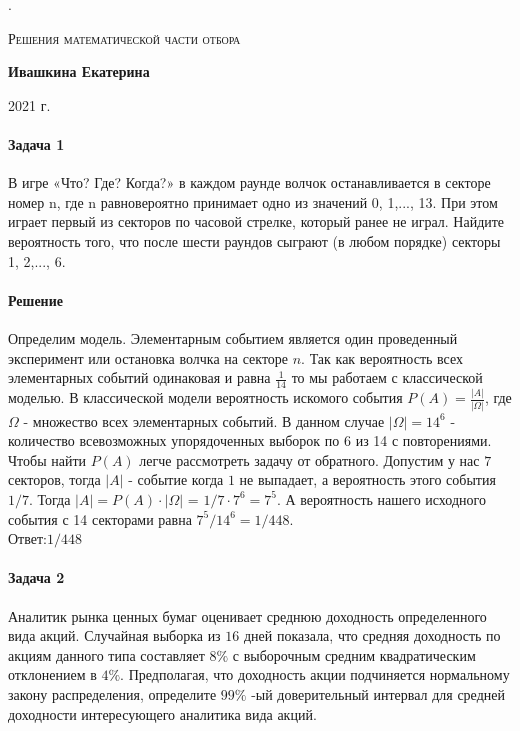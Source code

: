 \documentclass[a4paper, 12pt]{article}
\author{Ивашкина Екатерина}
\begin{document}
\begin{titlepage}
	\centering
	\vspace{5cm}
	{\scshape . \par}
	\vspace{4cm}
	{\scshape\Large Решения математической части отбора \par}
	\vspace{1cm}
	{\Large\bfseries Ивашкина Екатерина \par}
	\vspace{1cm}
	\vfill

	\vfill

	

	\vfill

        2021 г.
\end{titlepage}
\newpage
\paragraph{Задача 1}
В игре «Что? Где? Когда?» в каждом раунде волчок останавливается в секторе номер n, где n равновероятно принимает одно из значений 0, 1,..., 13. При этом играет первый из секторов по часовой стрелке, который ранее не играл. Найдите вероятность того, что после шести раундов сыграют (в любом порядке) секторы 1, 2,..., 6.
\paragraph{Решение}
Определим модель. Элементарным событием является один проведенный эксперимент или остановка волчка на секторе $n$. Так как вероятность всех элементарных событий одинаковая и равна $\frac{1}{14}$ то мы работаем с классической моделью. В классической модели вероятность искомого события $P(A) = \frac{|A|}{|\Omega|}$, где $\Omega$ - множество всех элементарных событий. В данном случае $|\Omega| = 14^6$ - количество всевозможных упорядоченных выборок по 6 из 14 с повторениями.
Чтобы найти $P(A)$ легче рассмотреть задачу от обратного. Допустим у нас $7$ секторов, тогда $|A|$ - событие когда $1$ не выпадает, а вероятность этого события $1/7$. Тогда $|A| = P(A) \cdot |\Omega|$ = $1/7 \cdot 7^6 = 7^5$. А вероятность нашего исходного события с 14 секторами равна $7^5/14^6 = 1/448$.\\
Ответ:$1/448$


\paragraph{Задача 2}
Аналитик рынка ценных бумаг оценивает среднюю доходность определенного вида акций. Случайная выборка из $16$ дней показала, что средняя доходность по акциям данного типа составляет $8\%$ с выборочным средним квадратическим отклонением в $4\%$. Предполагая, что доходность акции подчиняется нормальному закону распределения, определите $99\%$ -ый доверительный интервал для средней доходности интересующего аналитика вида акций.
\end{document}
